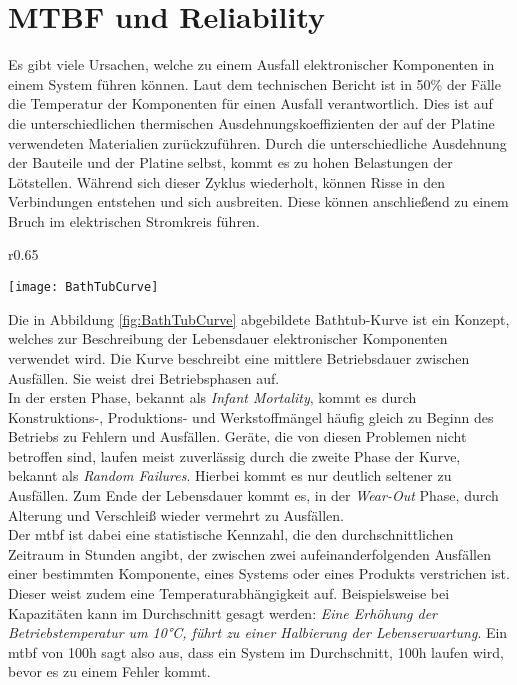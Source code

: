 \section{MTBF und Reliability}\label{sec:MTBF}
Es gibt viele Ursachen, welche zu einem Ausfall elektronischer Komponenten in einem System führen können. Laut dem technischen Bericht \cite{AIP} ist in 50\% der Fälle die Temperatur der Komponenten für einen Ausfall verantwortlich. Dies ist auf die unterschiedlichen thermischen Ausdehnungskoeffizienten der auf der Platine verwendeten Materialien zurückzuführen. Durch die unterschiedliche Ausdehnung der Bauteile und der Platine selbst, kommt es zu hohen Belastungen der Lötstellen. Während sich dieser Zyklus wiederholt, können Risse in den Verbindungen entstehen und sich ausbreiten. Diese können anschließend zu einem Bruch im elektrischen Stromkreis führen. \cite{AREPA_LifeExpectancy}\\
\begin{wrapfigure}{r}{0.65\textwidth}
    \vspace{-1.2cm}
    \captionsetup{justification=centering,format=plain, font=small}
    \begin{center}
      \texttt{[image: BathTubCurve]}
    \end{center}
    \vspace{-0.5cm}
    \caption{Bathtub Curve \cite{AREPA_LifeExpectancy}}
    \label{fig:BathTubCurve}
    \vspace{-1.5cm}
  \end{wrapfigure}
Die in Abbildung \ref{fig:BathTubCurve} abgebildete Bathtub-Kurve ist ein Konzept, welches zur Beschreibung der Lebensdauer elektronischer Komponenten verwendet wird. Die Kurve beschreibt eine mittlere Betriebsdauer zwischen Ausfällen. Sie weist drei Betriebsphasen auf.\\
In der ersten Phase, bekannt als \textit{Infant Mortality}, kommt es durch Konstruktions-, Produktions- und Werkstoffmängel häufig gleich zu Beginn des Betriebs zu Fehlern und Ausfällen. Geräte, die von diesen Problemen nicht betroffen sind, laufen meist zuverlässig durch die zweite Phase der Kurve, bekannt als \textit{Random Failures}. Hierbei kommt es nur deutlich seltener zu Ausfällen. Zum Ende der Lebensdauer kommt es, in der \textit{Wear-Out} Phase, durch Alterung und Verschleiß wieder vermehrt zu Ausfällen.\cite{AREPA_LifeExpectancy}\\ 
Der \ac{mtbf} ist dabei eine statistische Kennzahl, die den durchschnittlichen Zeitraum in Stunden angibt, der zwischen zwei aufeinanderfolgenden Ausfällen einer bestimmten Komponente, eines Systems oder eines Produkts verstrichen ist. Dieser weist zudem eine Temperaturabhängigkeit auf. Beispielsweise bei Kapazitäten kann im Durchschnitt gesagt werden: \textit{Eine Erhöhung der Betriebstemperatur um 10°C, führt zu einer Halbierung der Lebenserwartung}. Ein \ac{mtbf} von 100h sagt also aus, dass ein System im Durchschnitt, 100h laufen wird, bevor es zu einem Fehler kommt.\cite{MTBFReliability}\\

